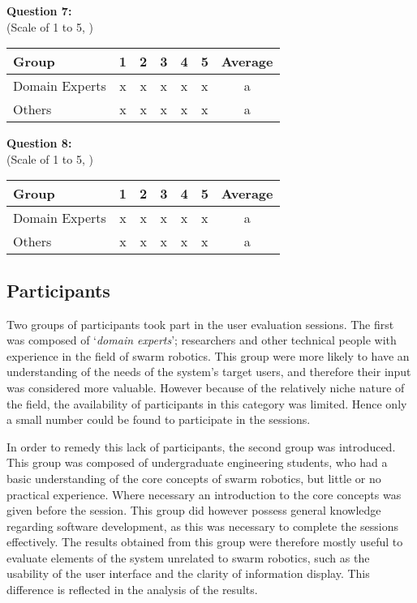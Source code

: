 \noindent\textbf{Question 7: }\\(Scale of 1 to 5, )

\begin{center}
\begin{tabular}{ l c c c c c c }
 Group & 1 & 2 & 3 & 4 & 5 & Average \\ 
 \hline
 Domain Experts & x & x & x & x & x & a \\
 Others 		& x & x & x & x & x & a \\
\end{tabular}
\end{center}

\noindent\textbf{Question 8: }\\(Scale of 1 to 5, )

\begin{center}
\begin{tabular}{ l c c c c c c }
 Group & 1 & 2 & 3 & 4 & 5 & Average \\ 
 \hline
 Domain Experts & x & x & x & x & x & a \\
 Others 		& x & x & x & x & x & a \\
\end{tabular}
\end{center}


\subsection{Participants}

Two groups of participants took part in the user evaluation sessions. The first was composed of `\textit{domain experts}'; researchers and other technical people with experience in the field of swarm robotics. This group were more likely to have an understanding of the needs of the system's target users, and therefore their input was considered more valuable. However because of the relatively niche nature of the field, the availability of participants in this category was limited. Hence only a small number could be found to participate in the sessions.

In order to remedy this lack of participants, the second group was introduced. This group was composed of undergraduate engineering students, who had a basic understanding of the core concepts of swarm robotics, but little or no practical experience. Where necessary an introduction to the core concepts was given before the session. This group did however possess general knowledge regarding software development, as this was necessary to complete the sessions effectively. The results obtained from this group were therefore mostly useful to evaluate elements of the system unrelated to swarm robotics, such as the usability of the user interface and the clarity of information display. This difference is reflected in the analysis of the results.

